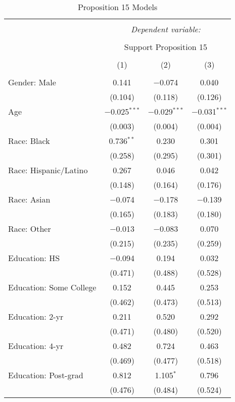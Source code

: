 
\begin{table}[!htbp] \centering 
  \caption{Proposition 15 Models} 
  \label{tab:reg_prop15_long} 
\footnotesize 
\begin{tabular}{@{\extracolsep{5pt}}lccc} 
\\[-1.8ex]\hline 
\hline \\[-1.8ex] 
 & \multicolumn{3}{c}{\textit{Dependent variable:}} \\ 
\cline{2-4} 
\\[-1.8ex] & \multicolumn{3}{c}{Support Proposition 15} \\ 
\\[-1.8ex] & (1) & (2) & (3)\\ 
\hline \\[-1.8ex] 
 Gender: Male & 0.141 & $-$0.074 & 0.040 \\ 
  & (0.104) & (0.118) & (0.126) \\ 
  Age & $-$0.025$^{***}$ & $-$0.029$^{***}$ & $-$0.031$^{***}$ \\ 
  & (0.003) & (0.004) & (0.004) \\ 
  Race: Black & 0.736$^{**}$ & 0.230 & 0.301 \\ 
  & (0.258) & (0.295) & (0.301) \\ 
  Race: Hispanic/Latino & 0.267 & 0.046 & 0.042 \\ 
  & (0.148) & (0.164) & (0.176) \\ 
  Race: Asian & $-$0.074 & $-$0.178 & $-$0.139 \\ 
  & (0.165) & (0.183) & (0.180) \\ 
  Race: Other & $-$0.013 & $-$0.083 & 0.070 \\ 
  & (0.215) & (0.235) & (0.259) \\ 
  Education: HS & $-$0.094 & 0.194 & 0.032 \\ 
  & (0.471) & (0.488) & (0.528) \\ 
  Education: Some College & 0.152 & 0.445 & 0.253 \\ 
  & (0.462) & (0.473) & (0.513) \\ 
  Education: 2-yr & 0.211 & 0.520 & 0.292 \\ 
  & (0.471) & (0.480) & (0.520) \\ 
  Education: 4-yr & 0.482 & 0.724 & 0.463 \\ 
  & (0.469) & (0.477) & (0.518) \\ 
  Education: Post-grad & 0.812 & 1.105$^{*}$ & 0.796 \\ 
  & (0.476) & (0.484) & (0.524) \\ 

\end{tabular}
\end{table}
